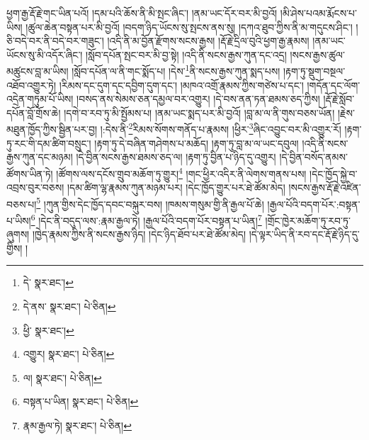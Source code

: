 ཕྱག་རྒྱ་རྡོ་རྗེ་གང་ཡིན་པའོ། །དམ་པའི་ཆོས་ནི་མི་སྤང་ཞིང་། །ནམ་ཡང་དོར་བར་མི་བྱའོ། །མི་ཤེས་པའམ་རྨོངས་པ་ཡིས། །ཚུལ་ཆེན་བསྟན་པར་མི་བྱའོ། །བདག་ཉིད་ཡོངས་སུ་སྤངས་ནས་སུ། །དཀའ་ཐུབ་ཀྱིས་ནི་མ་གདུངས་ཤིང་། །ཅི་བདེ་བར་ནི་བདེ་བར་གཟུང་། །འདི་ནི་མ་བྱོན་རྫོགས་སངས་རྒྱས། །རྡོ་རྗེ་དྲིལ་བུའི་ཕྱག་རྒྱ་རྣམས། །ནམ་ཡང་ཡོངས་སུ་མི་འདོར་ཞིང་། །སློབ་དཔོན་སྤང་བར་མི་བྱ་སྟེ། །འདི་ནི་སངས་རྒྱས་ཀུན་དང་འདྲ། །སངས་རྒྱས་ཚུལ་མཚུངས་བླ་མ་ཡིས། །སློབ་དཔོན་ལ་ནི་གང་སྨོད་པ། །དེས་\footnote{དེ་  སྣར་ཐང་། }ནི་སངས་རྒྱས་ཀུན་སྨད་པས། །རྟག་ཏུ་སྡུག་བསྔལ་འཐོབ་འགྱུར་ཏེ། །རིམས་དང་དུག་དང་དབྱིག་དུག་དང་། །མཁའ་འགྲོ་རྣམས་ཀྱིས་གཙེས་པ་དང་། །གདོན་དང་ལོག་འདྲེན་གཏུམ་པོ་ཡིས། །བསད་ནས་སེམས་ཅན་དམྱལ་བར་འགྱུར། །དེ་བས་ནན་ཏན་ཐམས་ཅད་ཀྱིས། །རྡོ་རྗེ་སློབ་དཔོན་བློ་གྲོས་ཆེ། །དགེ་བ་རབ་ཏུ་མི་སྤྱོམས་པ། །ནམ་ཡང་སྨད་པར་མི་བྱའོ། །བླ་མ་ལ་ནི་གུས་བཅས་ཡོན། །རྗེས་མཐུན་ཁྱོད་ཀྱིས་སྦྱིན་པར་བྱ། །:དེས་ནི་\footnote{དེ་ནས་  སྣར་ཐང་།  པེ་ཅིན། }རིམས་སོགས་གནོད་པ་རྣམས། །ཕྱིར་\footnote{ཕྱི་  སྣར་ཐང་། }ཞིང་འབྱུང་བར་མི་འགྱུར་རོ། །རྟག་ཏུ་རང་གི་དམ་ཚིག་བསྲུང་། །རྟག་ཏུ་དེ་བཞིན་གཤེགས་པ་མཆོད། །རྟག་ཏུ་བླ་མ་ལ་ཡང་དབུལ། །འདི་ནི་སངས་རྒྱས་ཀུན་དང་མཉམ། །དེ་བྱིན་སངས་རྒྱས་ཐམས་ཅད་ལ། །རྟག་ཏུ་བྱིན་པ་ཉིད་དུ་འགྱུར། །དེ་བྱིན་བསོད་ནམས་ཚོགས་ཡིན་ཏེ། །ཚོགས་ལས་དངོས་གྲུབ་མཆོག་ཏུ་གྱུར།\footnote{འགྱུར།  སྣར་ཐང་།  པེ་ཅིན། } །གང་ཕྱིར་འདིར་ནི་ལེགས་གནས་པས། །དེང་ཁྱོད་སྐྱེ་བ་འབྲས་བུར་བཅས། །དམ་ཚིག་ལྷ་རྣམས་ཀུན་མཉམ་པར། །དེང་ཁྱོད་གྱུར་པར་ཐེ་ཚོམ་མེད། །སངས་རྒྱས་རྡོ་རྗེ་འཛིན་བཅས་པ།\footnote{ལ།  སྣར་ཐང་།  པེ་ཅིན། } །ཀུན་གྱིས་དེང་ཁྱོད་དབང་བསྐུར་བས། །ཁམས་གསུམ་གྱི་ནི་རྒྱལ་པོ་ཆེ། །རྒྱལ་པོའི་བདག་པོར་:བསྟན་པ་ཡིས།\footnote{བསྟན་པ་ཡིན།  སྣར་ཐང་།  པེ་ཅིན། } །དེང་ནི་བདུད་ལས་:རྣམ་རྒྱལ་ཏེ། །རྒྱལ་པོའི་བདག་པོར་བསྟན་པ་ཡིན།\footnote{རྣམ་རྒྱལ་ཏེ།  སྣར་ཐང་།  པེ་ཅིན། } །གྲོང་ཁྱེར་མཆོག་ཏུ་རབ་ཏུ་ཞུགས། །ཁྱེད་རྣམས་ཀྱིས་ནི་སངས་རྒྱས་ཉིད། །དེང་ཉིད་ཐོབ་པར་ཐེ་ཚོམ་མེད། །དེ་ལྟར་ཡིད་ནི་རབ་དང་རྡོ་རྗེ་ཉིད་དུ་གྱིས། །
